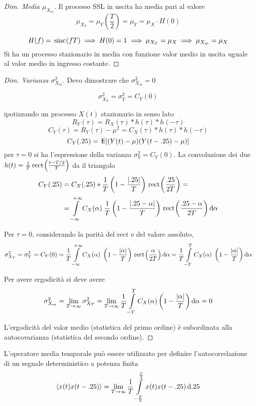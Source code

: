 \begin{proof}[Dim. Media $\mu_{X_m}$]
Il processo SSL in uscita ha media pari al valore
\[\mu_{X_T}=\mu_Y\left(\frac{T}{2}\right)=\mu_Y=\mu_X \cdot H(0)\]

\[H(f)=\,{\operatorname{sinc}}^{}\!\left({f T}\right)\implies H(0)=1\implies \mu_{X_T}=\mu_X \implies \mu_{X_m}=\mu_X \]
Si ha un processo stazionario in media con funzione valor medio in uscita uguale al valor medio in ingresso costante.
\end{proof}
\begin{proof}[Dim. Varianza $\sigma^2_{X_m}$]
Devo dimostrare che $\sigma^2_{X_m}=0$

\[\sigma^2_{X_T}=\sigma^2_{Y}=C_Y(0)\]

ipotizzando un processo $X(t)$ stazionario in senso lato
\[R_Y(\tau)=R_X(\tau)\ast h(\tau)\ast h(-\tau)\]
\[C_Y(\tau)=R_Y(\tau)-\mu^2=C_X(\tau)\ast h(\tau)\ast h(-\tau) \]
\[C_Y(.25)=\,{\operatorname{\mathsf{E}}}\!\left[{(Y(t)-\mu)(Y(t-.25)-\mu)}\right]\]
per $\tau=0$ si ha l'espressione della varianza $\sigma^2_Y=C_Y(0)$.
La convoluzione dei due $h(t)=\frac{1}{T}\,{\operatorname{rect}}^{}\!\left({\frac{t-T/2}{T}}\right)$ da il triangolo
\[\begin{split}
C_Y(.25)&=C_X(.25)\ast \frac{1}{T}\left(1-\frac{\left|{.25}\right|}{T}\right)\,{\operatorname{rect}}^{}\!\left({\frac{.25}{2 T}}\right)=\\
&=\int\limits_{-\infty}^{+\infty}{C_X(\alpha)\; \frac{1}{T}\left(1-\frac{\left|{.25-\alpha}\right|}{T}\right)\,{\operatorname{rect}}^{}\!\left({\frac{.25-\alpha}{2 T}}\right)}{\,\mathop{}\!\mathrm{d}{\alpha}}\end{split}\]

Per $\tau=0$, considerando la parità del rect e del valore assoluto,
\[\sigma^2_{X_T}=\sigma^2_{Y}=C_Y(0)=\frac{1}{T}\int\limits_{-\infty}^{+\infty}{C_X(\alpha)\; \left(1-\frac{\left|{\alpha}\right|}{T}\right)\,{\operatorname{rect}}^{}\!\left({\frac{\alpha}{2 T}}\right)}{\,\mathop{}\!\mathrm{d}{\alpha}}=\frac{1}{T}\int\limits_{-T}^{T}{C_X(\alpha)\; \left(1-\frac{\left|{\alpha}\right|}{T}\right)}{\,\mathop{}\!\mathrm{d}{\alpha}}
\]

Per avere ergodicità si deve avere 
\[\sigma^2_{X_m}=\lim\limits_{T\to\infty}\sigma^2_{X_T}=\lim\limits_{T\to\infty}\frac{1}{T}\int\limits_{-T}^{T}{C_X(\alpha)\left(1-\frac{\left|{\alpha}\right|}{T}\right)}{\,\mathop{}\!\mathrm{d}{\alpha}}=0\]

L'ergodicità del valor medio (statistica del primo ordine) è subordinata alla autocovarianza (statistica del secondo ordine).
\end{proof}

L'operatore media temporale può essere utilizzato per definire l'autocorrelazione di un segnale deterministico a potenza finita
\begin{equation}
\langle x(t)x(t-.25)\rangle=\lim\limits_{T\to\infty}\frac{1}{T}\int\limits_{-\frac{T}{2}}^{\frac{T}{2}}{x(t) x(t-.25)}{\,\mathop{}\!\mathrm{d}{.25}}
\end{equation}

